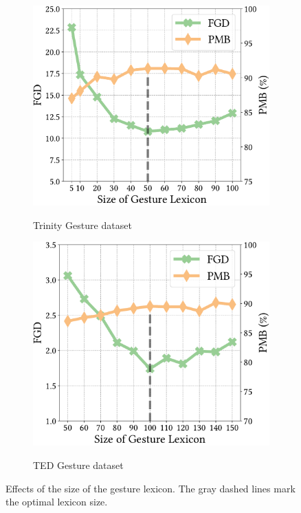 \begin{figure}[t]
    \centering
    \begin{subfigure}[t]{0.47\linewidth}
        \centering
        \caption*{Trinity Gesture dataset}
        \includegraphics[width=\linewidth]{figures/fig12a.pdf}
        \label{fig:fig12a}
    \end{subfigure} 
    \hspace{\fill}
    \begin{subfigure}[t]{0.47\linewidth}
        \centering
        \caption*{TED Gesture dataset}
        \includegraphics[width=\linewidth]{figures/fig12b.pdf}
        \label{fig:fig12b}
    \end{subfigure} 
    \caption{Effects of the size of the gesture lexicon. The gray dashed lines mark the optimal lexicon size.}
    \label{fig:fig12}
    \Description{}
\end{figure}
%
